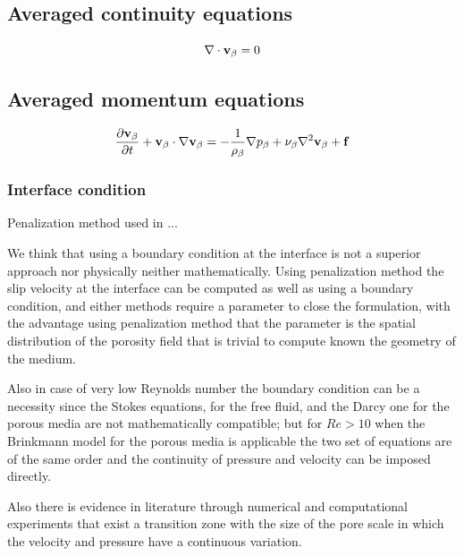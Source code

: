 \subsection{Averaged continuity equations}


\begin{equation}
\nabla \cdot \textbf{v}_{\beta} = 0
\label{eq:cont_vans}
\end{equation}

\subsection{Averaged momentum equations}


\begin{equation}
\dfrac{\partial \textbf{v}_{\beta}}{\partial t} + \textbf{v}_{\beta} \cdot \nabla \textbf{v}_{\beta} = -\frac{1}{\rho_{\beta}} \nabla p_{\beta} + \nu_{\beta} \nabla^2  \textbf{v}_{\beta}  + \mathbf{f}
\label{eq:mom_vans}
\end{equation}



\subsubsection{Interface condition}

Penalization method \citet{angot1999penalization} used in\cite{bruneau2004passive} \cite{bruneau2008numerical} \cite{bruneau2010coupling}...


We think that using a boundary condition at the interface is not a superior approach nor physically neither mathematically.
Using penalization method the slip velocity at the interface can be computed as well as using a boundary condition, and either methods require a parameter to close the formulation, with the advantage using penalization method that the parameter is the spatial distribution of the porosity field that is trivial to compute known the geometry of the medium.

Also in case of very low Reynolds number the boundary condition can be a necessity since the Stokes equations, for the free fluid, and the Darcy one for the porous media are not mathematically compatible; but for $Re>10$ when the Brinkmann model for the porous media is applicable the two set of equations are of the same order and the continuity of pressure and velocity can be imposed directly.

Also there is evidence in literature through numerical and computational experiments \citet{ochoa2017fluid} that exist a transition zone with the size of the pore scale in which the velocity and pressure have a continuous variation.

